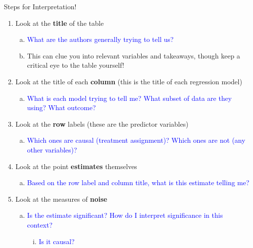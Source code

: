 \documentclass[
  11pt,
  ignorenonframetext,
]{beamer}
\providecommand{\tightlist}{%
  \setlength{\itemsep}{0pt}\setlength{\parskip}{0pt}}
\begin{document}
\begin{frame}{Steps for Interpretation!}
\protect{}\label{steps-for-interpretation}
\small

\begin{enumerate}
\tightlist
\item
  Look at the \textbf{title} of the table \pause

  \begin{enumerate}
  [a.]
  \tightlist
  \item
    \textcolor{blue}{What are the authors generally trying to tell us?}
  \item
    This can clue you into relevant variables and takeaways, though keep
    a critical eye to the table yourself! \pause
  \end{enumerate}
\item
  Look at the title of each \textbf{column} (this is the title of each
  regression model) \pause

  \begin{enumerate}
  [a.]
  \tightlist
  \item
    \textcolor{blue}{What is each model trying to tell me? What subset of data are they using? What outcome?}
    \pause
  \end{enumerate}
\item
  Look at the \textbf{row} labels (these are the predictor variables)
  \pause

  \begin{enumerate}
  [a.]
  \tightlist
  \item
    \textcolor{blue}{Which ones are causal (treatment assignment)? Which ones are not (any other variables)?}
    \pause
  \end{enumerate}
\item
  Look at the point \textbf{estimates} themselves \pause

  \begin{enumerate}
  [a.]
  \tightlist
  \item
    \textcolor{blue}{Based on the row label and column title, what is this estimate telling me?}
    \pause
  \end{enumerate}
\item
  Look at the measures of \textbf{noise} \pause

  \begin{enumerate}
  [a.]
  \tightlist
  \item
    \textcolor{blue}{Is the estimate significant? How do I interpret significance in this context?}

    \begin{enumerate}
    [i.]
    \tightlist
    \item
      \textcolor{blue}{Is it causal?}
    \end{enumerate}
  \end{enumerate}
\end{enumerate}

\normalsize
\end{frame}
\end{document}
